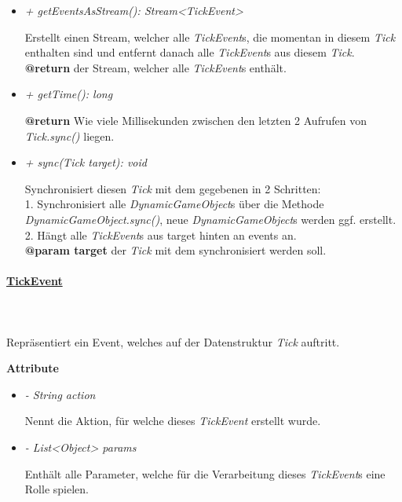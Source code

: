 \begin{itemize}
            \pagebreak
            \item \textit{+ getEventsAsStream(): Stream<TickEvent>}
                \begin{leftbar}[0.9\linewidth]
                    Erstellt einen Stream, welcher alle \textit{TickEvent}s, die momentan in diesem \textit{Tick} enthalten sind
                    und entfernt danach alle \textit{TickEvent}s aus diesem \textit{Tick}.\\
                    \textbf{@return} der Stream, welcher alle \textit{TickEvent}s enthält.
                \end{leftbar}
            \item \textit{+ getTime(): long}
                \begin{leftbar}[0.9\linewidth]
                    \textbf{@return} Wie viele Millisekunden zwischen den letzten 2 Aufrufen von \textit{Tick.sync()} liegen.
                \end{leftbar}
            \item \textit{+ sync(Tick target): void}
                \begin{leftbar}[0.9\linewidth]
                    Synchronisiert diesen \textit{Tick} mit dem gegebenen in 2 Schritten:\\
                    1. Synchronisiert alle \textit{DynamicGameObject}s über die Methode \textit{DynamicGameObject.sync()}, neue \textit{DynamicGameObject}s
                    werden ggf. erstellt.\\
                    2. Hängt alle \textit{TickEvent}s aus target hinten an events an.\\
                    \textbf{@param target} der \textit{Tick} mit dem synchronisiert werden soll.
                \end{leftbar}
        \end{itemize}

    \paragraph{\underline{TickEvent}} \mbox{}\\
    \\
        Repräsentiert ein Event, welches auf der Datenstruktur \textit{Tick} auftritt.\par

        \textbf{Attribute}
        \begin{itemize}
            \item \textit{- String action}
                \begin{leftbar}[0.9\linewidth]
                    Nennt die Aktion, für welche dieses \textit{TickEvent} erstellt wurde.
                \end{leftbar}
            \item \textit{- List<Object> params}
                \begin{leftbar}[0.9\linewidth]
                    Enthält alle Parameter, welche für die Verarbeitung dieses \textit{TickEvent}s eine Rolle spielen.
                \end{leftbar}
        \end{itemize}

